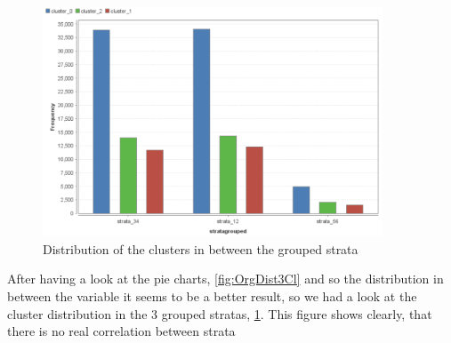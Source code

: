\begin{figure}[!htbp]
\centering
\includegraphics[width=0.9\textwidth]{ClusterOrigRapidDistribution2Cluster.PNG}
\caption{Distribution of the clusters in between the grouped strata}
\label{fig:Groupdist}
\end{figure}

After having a look at the pie charts, \ref{fig:OrgDist3Cl} and so the distribution in between the variable it seems to be a better result, so we had a look at the cluster distribution in the 3 grouped stratas, \ref{fig:Groupdist}. This figure shows clearly, that there is no real correlation between strata 

